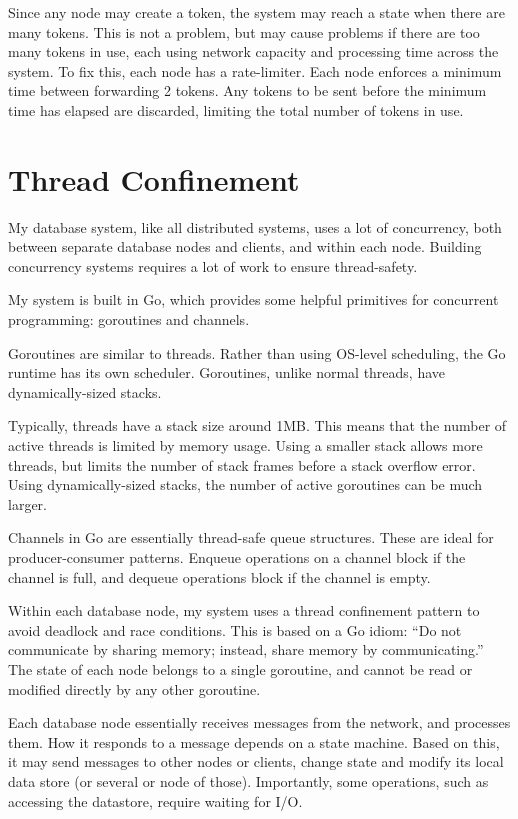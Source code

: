 \documentclass[12pt,a4paper,twoside,openright]{report}
\begin{document}
Since any node may create a token, the system may reach a state when there are many tokens. This is not a problem, but may cause problems if there are too many tokens in use, each using network capacity and processing time across the system. To fix this, each node has a rate-limiter. Each node enforces a minimum time between forwarding 2 tokens. Any tokens to be sent before the minimum time has elapsed are discarded, limiting the total number of tokens in use.


\section{Thread Confinement}


My database system, like all distributed systems, uses a lot of concurrency, both between separate database nodes and clients, and within each node. Building concurrency systems requires a lot of work to ensure thread-safety.

My system is built in Go, which provides some helpful primitives for concurrent programming: goroutines and channels.

Goroutines are similar to threads. Rather than using OS-level scheduling, the Go runtime has its own scheduler. Goroutines, unlike normal threads, have dynamically-sized stacks.

Typically, threads have a stack size around 1MB. This means that the number of active threads is limited by memory usage. Using a smaller stack allows more threads, but limits the number of stack frames before a stack overflow error. Using dynamically-sized stacks, the number of active goroutines can be much larger.

Channels in Go are essentially thread-safe queue structures. These are ideal for producer-consumer patterns. Enqueue operations on a channel block if the channel is full, and dequeue operations block if the channel is empty.

Within each database node, my system uses a thread confinement pattern to avoid deadlock and race conditions. This is based on a Go idiom: ``Do not communicate by sharing memory; instead, share memory by communicating.'' The state of each node belongs to a single goroutine, and cannot be read or modified directly by any other goroutine. \cite{effective}

Each database node essentially receives messages from the network, and processes them. How it responds to a message depends on a state machine. Based on this, it may send messages to other nodes or clients, change state and modify its local data store (or several or node of those). Importantly, some operations, such as accessing the datastore, require waiting for I/O.
\end{document}
